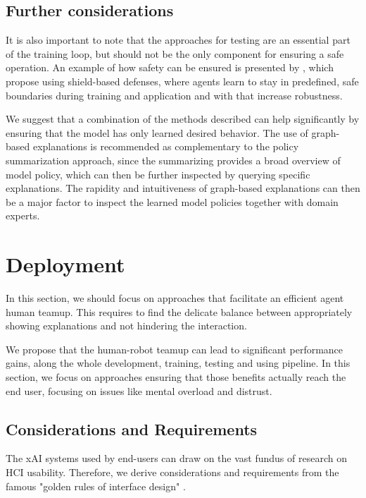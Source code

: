 \documentclass[twoside,11pt]{article}
\begin{document}
\subsection{Further considerations}
It is also important to note that the approaches for testing are an essential part of the training loop, but should not be the only component for ensuring a safe operation. An example of how safety can be ensured is presented by \citet{XiongEtAl:2020:Robustness}, which propose using shield-based defenses, where agents learn to stay in predefined, safe boundaries during training and application and with that increase robustness.

We suggest that a combination of the methods described can help significantly by ensuring that the model has only learned desired behavior. The use of graph-based explanations is recommended as complementary to the policy summarization approach, since the summarizing provides a broad overview of model policy, which can then be further inspected by querying specific explanations. The rapidity and intuitiveness of graph-based explanations can then be a major factor to inspect the learned model policies together with domain experts.

\section{Deployment}


In this section, we should focus on approaches that facilitate an efficient agent human teamup. This requires to find the delicate balance between appropriately showing explanations and not hindering the interaction.

We propose that the human-robot teamup can lead to significant performance gains, along the whole development, training, testing and using pipeline. In this section, we focus on approaches ensuring that those benefits actually reach the end user, focusing on issues like mental overload and distrust.

\subsection{Considerations and Requirements}

The xAI systems used by end-users can draw on the vast fundus of research on HCI usability. Therefore, we derive considerations and requirements from the famous "golden rules of interface design" \citep{ShneidermanEtAl:2016:GoldenRulesHCI}.
\end{document}
